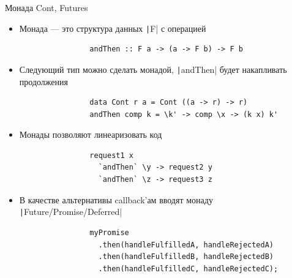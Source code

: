     \begin{frame}[fragile]{Монада Cont, Futures}
        \begin{itemize}
            \item Монада --- это структура данных \texttt|F| с операцией
            \begin{verbatim}
                andThen :: F a -> (a -> F b) -> F b
            \end{verbatim}
            \item Следующий тип можно сделать монадой, \texttt|andThen| будет накапливать продолжения
            \begin{verbatim}
                data Cont r a = Cont ((a -> r) -> r)
                andThen comp k = \k' -> comp \x -> (k x) k'
            \end{verbatim}
            \item Монады позволяют линеаризовать код
            \begin{verbatim}
                request1 x
                  `andThen` \y -> request2 y
                  `andThen` \z -> request3 z
            \end{verbatim}
            \item В качестве альтернативы callback'ам вводят монаду \texttt|Future/Promise/Deferred|
            \begin{verbatim}
                myPromise
                  .then(handleFulfilledA, handleRejectedA)
                  .then(handleFulfilledB, handleRejectedB)
                  .then(handleFulfilledC, handleRejectedC);
            \end{verbatim}
        \end{itemize}
    \end{frame}

